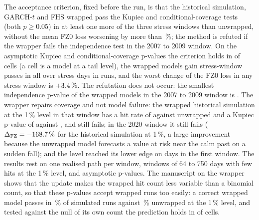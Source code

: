 The acceptance criterion, fixed before the run, is that the historical simulation, GARCH-$t$ and FHS wrapped pass the Kupiec and conditional-coverage tests (both $p\ge 0.05$) in at least one more of the three stress windows than unwrapped, without the mean FZ0 loss worsening by more than \pxSixteenFzTol{}\,\%; the method is refuted if the wrapper fails the independence test in the 2007 to 2009 window. On the asymptotic Kupiec and conditional-coverage p-values the criterion holds in \pxSixteenCellsHold{} of \pxSixteenCells{} cells (a cell is a model at a tail level), the wrapped models gain \pxSixteenExtra{} stress-window passes in all over \pxSixteenStressDays{} stress days in \pxSixteenRuns{} runs, and the worst change of the FZ0 loss in any stress window is $+3.4\,\%$. The refutation does not occur: the smallest independence p-value of the wrapped models in the 2007 to 2009 window is \pxSixteenIndMin{}. The wrapper repairs coverage and not model failure: the wrapped historical simulation at the 1\,\% level in that window has a hit rate of \pxSixteenHsHitWr{} against \pxSixteenHsHitUn{} unwrapped and a Kupiec p-value of \pxSixteenHsKupWr{} against \pxSixteenHsKupUn{}, and still fails; in the 2020 window it still fails ($\Delta_{\mathrm{FZ}}=-168.7\,\%$ for the historical simulation at 1\,\%, a large improvement because the unwrapped model forecasts a value at risk near the calm past on a sudden fall); and the level reached its lower edge on \pxSixteenHsClipped{} days in the first window. The results rest on one realised path per window, windows of 64 to 750 days with few hits at the 1\,\% level, and asymptotic p-values. The manuscript on the wrapper shows that the update makes the wrapped hit count less variable than a
binomial count, so that these p-values accept wrapped runs too easily: a correct wrapped model passes in \pxPpSixteenDispAci{}\,\% of simulated runs against \pxPpSixteenDispUnw{}\,\% unwrapped at the 1\,\% level, and
tested against the null of its own count the prediction holds in \pxPpSixteenHoneGain{} of \pxPpSixteenCells{} cells.

